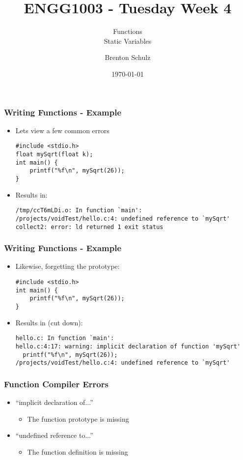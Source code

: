 \documentclass[14pt]{beamer}
\title{ENGG1003 - Tuesday Week 4}
\subtitle{Functions\\Static Variables}
\author{Brenton Schulz}
\institute{University of Newcastle}
\date{\today}
\begin{document}
\titlepage

\begin{frame}[fragile]
\frametitle{Writing Functions - Example}

\begin{itemize}
\item Lets view a few common errors
\begin{lstlisting}[style=CStyle]
#include <stdio.h>
float mySqrt(float k);
int main() {
	printf("%f\n", mySqrt(26));
}
\end{lstlisting}
\item Results in:
\begin{lstlisting}[style=pseudo]
/tmp/ccT6mLDi.o: In function `main':
/projects/voidTest/hello.c:4: undefined reference to `mySqrt'
collect2: error: ld returned 1 exit status
\end{lstlisting}
\end{itemize}
\end{frame}

\begin{frame}[fragile]
\frametitle{Writing Functions - Example}
\begin{itemize}
\item Likewise, forgetting the prototype:
\begin{lstlisting}[style=CStyle]
#include <stdio.h>
int main() {
	printf("%f\n", mySqrt(26));
}
\end{lstlisting}
\item Results in (cut down):
\begin{lstlisting}[style=pseudo]
hello.c: In function `main':
hello.c:4:17: warning: implicit declaration of function 'mySqrt'
  printf("%f\n", mySqrt(26));
/projects/voidTest/hello.c:4: undefined reference to `mySqrt'

\end{lstlisting}
\end{itemize}
\end{frame}

\begin{frame}
\frametitle{Function Compiler Errors}
\begin{itemize}
\item ``implicit declaration of...''
	\begin{itemize}
		\item The function prototype is missing
	\end{itemize}
\item ``undefined reference to...''
	\begin{itemize}
		\item The function definition is missing
	\end{itemize}
\end{itemize}
\end{frame}
\end{document}
